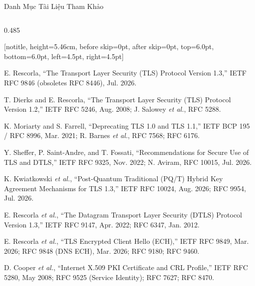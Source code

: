 \documentclass[aspectratio=169, 10pt]{beamer}
\begin{document}
\begin{frame}{Danh Mục Tài Liệu Tham Khảo}
	\begin{columns}[T]
		\begin{column}{0.485\textwidth}
			\begin{accentcard}[uetblue]{}[notitle, height=5.46cm, before skip=0pt, after skip=0pt, top=6.0pt, bottom=6.0pt, left=4.5pt, right=4.5pt]
				\raggedright
				\begin{list}{}{%
					\setlength{\leftmargin}{13.5pt}%
					\setlength{\labelwidth}{11pt}%
					\setlength{\labelsep}{2.5pt}%
					\setlength{\itemindent}{0pt}%
					\setlength{\itemsep}{4.4pt}%
					\setlength{\parsep}{0pt}%
					\setlength{\topsep}{0pt}%
					\fontsize{4.85pt}{6.25pt}\selectfont%
				}
					\item[\color{uetblue}\textbf{[1]}] E. Rescorla, ``The Transport Layer Security (TLS) Protocol Version 1.3,'' IETF RFC 9846 (obsoletes RFC 8446), Jul. 2026.
					\item[\color{uetblue}\textbf{[2]}] T. Dierks and E. Rescorla, ``The Transport Layer Security (TLS) Protocol Version 1.2,'' IETF RFC 5246, Aug. 2008; J. Salowey \textit{et al.}, RFC 5288.
					\item[\color{uetblue}\textbf{[3]}] K. Moriarty and S. Farrell, ``Deprecating TLS 1.0 and TLS 1.1,'' IETF BCP 195 / RFC 8996, Mar. 2021; R. Barnes \textit{et al.}, RFC 7568; RFC 6176.
					\item[\color{uetblue}\textbf{[4]}] Y. Sheffer, P. Saint-Andre, and T. Fossati, ``Recommendations for Secure Use of TLS and DTLS,'' IETF RFC 9325, Nov. 2022; N. Aviram, RFC 10015, Jul. 2026.
					\item[\color{uetblue}\textbf{[5]}] K. Kwiatkowski \textit{et al.}, ``Post-Quantum Traditional (PQ/T) Hybrid Key Agreement Mechanisms for TLS 1.3,'' IETF RFC 10024, Aug. 2026; RFC 9954, Jul. 2026.
					\item[\color{uetblue}\textbf{[6]}] E. Rescorla \textit{et al.}, ``The Datagram Transport Layer Security (DTLS) Protocol Version 1.3,'' IETF RFC 9147, Apr. 2022; RFC 6347, Jan. 2012.
					\item[\color{uetblue}\textbf{[7]}] E. Rescorla \textit{et al.}, ``TLS Encrypted Client Hello (ECH),'' IETF RFC 9849, Mar. 2026; RFC 9848 (DNS ECH), Mar. 2026; RFC 9180; RFC 9460.
					\item[\color{uetblue}\textbf{[8]}] D. Cooper \textit{et al.}, ``Internet X.509 PKI Certificate and CRL Profile,'' IETF RFC 5280, May 2008; RFC 9525 (Service Identity); RFC 7627; RFC 8470.
				\end{list}
			\end{accentcard}
		\end{column}


\end{columns}
\end{frame}
\end{document}
